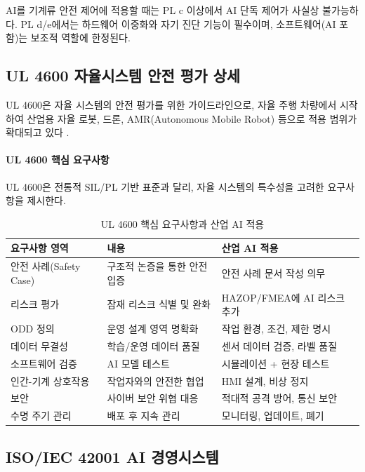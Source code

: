 AI를 기계류 안전 제어에 적용할 때는 PL c 이상에서 AI 단독 제어가 사실상 불가능하다. PL d/e에서는 하드웨어 이중화와 자기 진단 기능이 필수이며, 소프트웨어(AI 포함)는 보조적 역할에 한정된다.

\subsection{UL 4600 자율시스템 안전 평가 상세}
\label{sec:19.2.3}

UL 4600은 자율 시스템의 안전 평가를 위한 가이드라인으로, 자율 주행 차량에서 시작하여 산업용 자율 로봇, 드론, AMR(Autonomous Mobile Robot) 등으로 적용 범위가 확대되고 있다 \cite{ul4600}.

\paragraph{UL 4600 핵심 요구사항}

UL 4600은 전통적 SIL/PL 기반 표준과 달리, 자율 시스템의 특수성을 고려한 요구사항을 제시한다.

\begin{table}[htbp]
\centering
\caption{UL 4600 핵심 요구사항과 산업 AI 적용}
\label{tab:19_ul4600}
\begin{tabularx}{\textwidth}{p{3cm}Xp{4cm}}
\toprule
\textbf{요구사항 영역} & \textbf{내용} & \textbf{산업 AI 적용} \\
\midrule
안전 사례(Safety Case) & 구조적 논증을 통한 안전 입증 & 안전 사례 문서 작성 의무 \\
리스크 평가 & 잠재 리스크 식별 및 완화 & HAZOP/FMEA에 AI 리스크 추가 \\
ODD 정의 & 운영 설계 영역 명확화 & 작업 환경, 조건, 제한 명시 \\
데이터 무결성 & 학습/운영 데이터 품질 & 센서 데이터 검증, 라벨 품질 \\
소프트웨어 검증 & AI 모델 테스트 & 시뮬레이션 + 현장 테스트 \\
인간-기계 상호작용 & 작업자와의 안전한 협업 & HMI 설계, 비상 정지 \\
보안 & 사이버 보안 위협 대응 & 적대적 공격 방어, 통신 보안 \\
수명 주기 관리 & 배포 후 지속 관리 & 모니터링, 업데이트, 폐기 \\
\bottomrule
\end{tabularx}
\end{table}

\subsection{ISO/IEC 42001 AI 경영시스템}
\label{sec:19.2.4}

